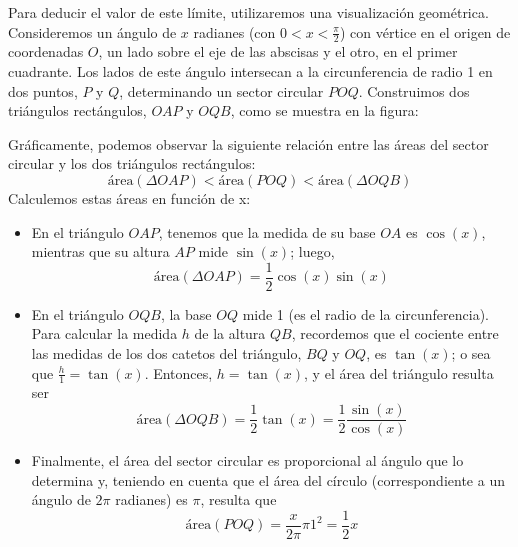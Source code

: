 \documentclass[../Teoría.root.tex]{subfiles}
\begin{document}
Para deducir el valor de este límite, utilizaremos una visualización geométrica.
Consideremos un ángulo de \(x\) radianes (con \(0<x<\frac{\pi}{2}\)) con vértice en el origen de coordenadas \(O\), un lado sobre el eje de las abscisas y el otro, en el primer cuadrante.
Los lados de este ángulo intersecan a la circunferencia de radio 1 en dos puntos, \(P\) y \(Q\), determinando un sector circular \(POQ\).
Construimos dos triángulos rectángulos, \(OAP\) y \(OQB\), como se muestra en la figura:
\begin{center}
    \begin{scaletikzpicturetowidth}{.5\linewidth}
    \end{scaletikzpicturetowidth}
\end{center}
Gráficamente, podemos observar la siguiente relación entre las áreas del sector circular y los dos triángulos rectángulos:
\[\text{área}(\Delta OAP)<\text{área}(POQ)<\text{área}(\Delta OQB)\]
Calculemos estas áreas en función de x:
\begin{itemize}
    \item En el triángulo \(OAP\), tenemos que la medida de su base \(OA\) es \(\cos(x)\), mientras que su altura \(AP\) mide \(\sin(x)\); luego,
          \[\text{área}(\Delta OAP)=\frac{1}{2}\cos(x)\sin(x)\]
    \item En el triángulo \(OQB\), la base \(OQ\) mide 1 (es el radio de la circunferencia).
          Para calcular la medida \(h\) de la altura \(QB\), recordemos que el cociente entre las medidas de los dos catetos del triángulo, \(BQ\) y \(OQ\), es \(\tan(x)\);
          o sea que \(\frac{h}{1}=\tan(x)\).
          Entonces, \(h=\tan(x)\), y el área del triángulo resulta ser
          \[\text{área}(\Delta OQB)=\frac{1}{2}\tan(x)=\frac{1}{2}\frac{\sin(x)}{\cos(x)}\]
    \item Finalmente, el área del sector circular es proporcional al ángulo que lo determina y, teniendo en cuenta que el área del círculo (correspondiente a un ángulo de \(2\pi\) radianes) es \(\pi\), resulta que
          \[\text{área}(POQ)=\frac{x}{2\pi}\pi 1^2=\frac{1}{2}x\]
\end{itemize}
\end{document}
